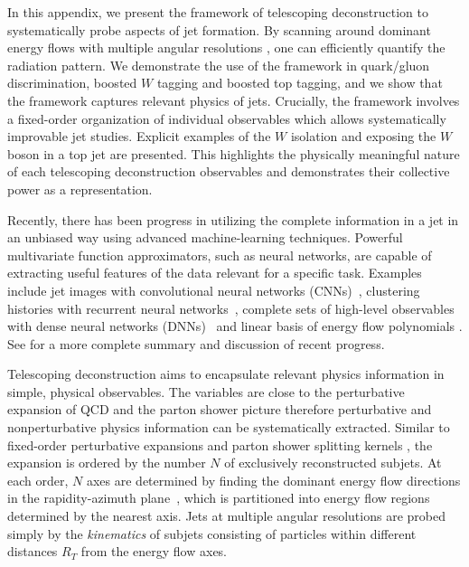 \documentclass[notoc]{JHEP3}
\begin{document}
In this appendix, we present the framework of telescoping deconstruction to systematically probe aspects of jet formation. By scanning around dominant energy flows with multiple angular resolutions \cite{Chien:2013kca,Chien:2014hla}, one can efficiently quantify the radiation pattern. We demonstrate the use of the framework in quark/gluon discrimination, boosted $W$ tagging and boosted top tagging, and we show that the framework captures relevant physics of jets. Crucially, the framework involves a fixed-order organization of individual observables which allows systematically improvable jet studies. Explicit examples of the $W$ isolation \cite{Chien:2017xrb} and exposing the $W$ boson in a top jet are presented. This highlights the physically meaningful nature of each telescoping deconstruction observables and demonstrates their collective power as a representation.

Recently, there has been progress in utilizing the complete information in a jet in an unbiased way using advanced machine-learning techniques. Powerful multivariate function approximators, such as neural networks, are capable of extracting useful features of the data relevant for a specific task. Examples include jet images with convolutional neural networks (CNNs)~\cite{Cogan:2014oua,deOliveira:2015xxd,Komiske:2016rsd,Kasieczka:2017nvn}, clustering histories with recurrent neural networks~\cite{Louppe:2017ipp}, complete sets of high-level observables with dense neural networks (DNNs)~\cite{Datta:2017rhs,Datta:2017lxt,Aguilar-Saavedra:2017rzt} and linear basis of energy flow polynomials \cite{Komiske:2017aww}. See \cite{Larkoski:2017jix} for a more complete summary and discussion of recent progress. %

Telescoping deconstruction aims to encapsulate relevant physics information in simple, physical observables. The variables are close to the perturbative expansion of QCD and the parton shower picture therefore perturbative and nonperturbative physics information can be systematically extracted. Similar to fixed-order perturbative expansions and parton shower splitting kernels \cite{Nagy:2017ggp}, the expansion is ordered by the number $N$ of exclusively reconstructed subjets. At each order, $N$ axes are determined by finding the dominant energy flow directions in the rapidity-azimuth plane~\cite{Stewart:2010tn,Chien:2013kca,Stewart:2015waa,Thaler:2015xaa}, which is partitioned into energy flow regions determined by the nearest axis. Jets at multiple angular resolutions are probed simply by the {\sl kinematics} of subjets consisting of particles within different distances $R_T$ from the energy flow axes.
\end{document}
